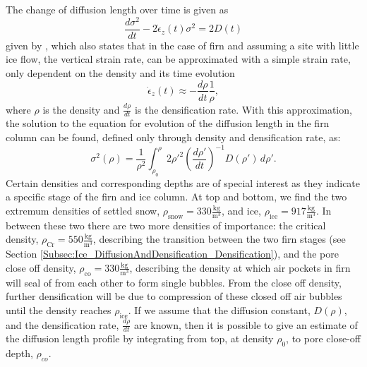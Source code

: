 \documentclass[../../CompleteThesis2/Complete_2ndDraft]{subfiles}
\begin{document}
The change of diffusion length over time is given as 
\begin{equation}
	\frac{d\sigma^2}{dt} - 2\dot{\epsilon}_z (t)\sigma^2 = 2 D(t)
	\label{Eq:Evolution_DiffLen}
\end{equation}
given by \cite[Johnsen, 1977]{Johnsen1977}, which also states that in the case of firn and assuming a site with little ice flow, the vertical strain rate, can be approximated with a simple strain rate, only dependent on the density and its time evolution
\begin{equation}
	\dot{\epsilon}_z(t) \approx - \frac{d\rho}{dt}\frac{1}{\rho}
	\label{Eq:strain_rate_approx},
\end{equation}
where $\rho$ is the density and $\frac{d\rho}{dt}$ is the densification rate. With this approximation, the solution to the equation for evolution of the diffusion length in the firn column can be found, defined only through density and densification rate, as:
\begin{equation}
	\sigma^2(\rho) =\frac{1}{\rho^2} \int_{\rho_0}^{\rho}2\rho'^2\left(\frac{d\rho'}{dt}\right)^{-1} D(\rho') \, d\rho'.
	\label{Eq:Diff_Len_Firn}
\end{equation}
Certain densities and corresponding depths are of special interest as they indicate a specific stage of the firn and ice column. At top and bottom, we find the two extremum densities of settled snow, $\rho_{\text{snow}} = 330 \frac{\text{kg}}{\text{m}^3}$, and ice, $\rho_{\text{ice}} = 917 \frac{\text{kg}}{\text{m}^3}$. In between these two there are two more densities of importance: the critical density, $\rho_{\text{Cr}} = 550 \frac{\text{kg}}{\text{m}^3}$, describing the transition between the two firn stages (see Section \ref{Subsec:Ice_DiffusionAndDensification_Densification}), and the pore close off density, $\rho_{\text{co}} = 330 \frac{\text{kg}}{\text{m}^3}$, describing the density at which air pockets in firn will seal of from each other to form single bubbles. From the close off density, further densification will be due to compression of these closed off air bubbles until the density reaches $\rho_{\text{ice}}$.
If we assume that the diffusion constant, $D(\rho)$, and the densification rate, $\frac{d\rho}{dt}$ are known, then it is possible to give an estimate of the diffusion length profile by integrating from top, at density $\rho_0$, to pore close-off depth, $\rho_{co}$.
\end{document}

